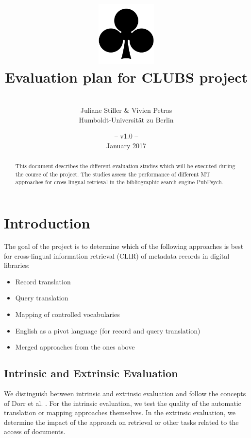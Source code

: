 \documentclass[a4paper,11pt]{article}
\title{
\includegraphics[width=3cm]{./img/200px-SuitClubs.png} \\
\Huge Evaluation plan for CLUBS project \\ 
}
\author{\vspace*{1cm}\\ \LARGE Juliane Stiller \& Vivien Petras \medskip \\ \Large Humboldt-Universit\"at zu Berlin}
\date{\vspace*{2cm} -- v1.0 --\\January 2017}
\begin{document}
\clearpage\maketitle
\thispagestyle{empty}

\vspace*{5cm}
\begin{abstract}
This document describes the different evaluation studies which will be executed during the course of the project. The studies assess the performance of different MT approaches for cross-lingual retrieval in the bibliographic search engine PubPsych.
\end{abstract}

\newpage
\tableofcontents
\clearpage


\section{Introduction}
\label{s:intro}

The goal of the project is to determine which of the following approaches is best for cross-lingual information retrieval (CLIR) of metadata records in digital libraries:
\begin{itemize}
\item Record translation
\item Query translation
\item Mapping of controlled vocabularies
\item English as a pivot language (for record and query translation)
\item Merged approaches from the ones above
\end{itemize}

\subsection{Intrinsic and Extrinsic Evaluation}
We distinguish between intrinsic and extrinsic evaluation and follow the concepts of Dorr et al. \cite{dorr_machine_2011}. For the intrinsic evaluation, we test the quality of the automatic translation or mapping approaches themselves. In the extrinsic evaluation, we determine the impact of the approach on retrieval or other tasks related to the access of documents.
\end{document}
